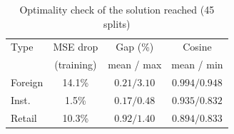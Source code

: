 \begin{table}[htbp]
  \caption{Optimality check of the solution reached (45 splits)}
  \label{tab:convergence}
  \small
  \centering
  \begin{tabular}{@{}lccc@{}}
    \toprule
    Type & MSE drop & Gap (\%) & Cosine \\
     & (training) & mean / max & mean / min \\
    \midrule
    Foreign & 14.1\% & $0.21/3.10$ & $0.994/0.948$ \\
    Inst.   & 1.5\%  & $0.17/0.48$ & $0.935/0.832$ \\
    Retail  & 10.3\% & $0.92/1.40$ & $0.894/0.833$ \\
    \bottomrule
  \end{tabular}
\end{table}
